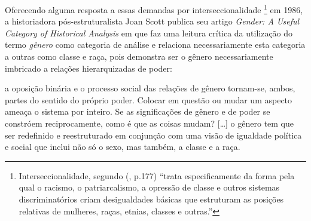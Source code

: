 
Oferecendo alguma resposta a essas demandas por interseccionalidade
\footnote{Interseccionalidade, segundo  (\citeyear{CRENSHAW2002}, p.177) ``trata especificamente da forma pela qual o racismo, o patriarcalismo, a opressão de classe e outros sistemas discriminatórios criam desigualdades básicas que estruturam as posições relativas de mulheres, raças, etnias, classes e outras.''} em 1986, a historiadora pós-estruturalista Joan Scott publica seu artigo \emph{Gender: A Useful Category of Historical Analysis} em que faz uma leitura crítica da utilização do termo \emph{gênero} como categoria de análise e relaciona necessariamente esta categoria a outras como classe e raça, pois demonstra ser o gênero necessariamente imbricado a relações hierarquizadas de poder:

\begin{citacao}
a oposição binária e o processo social das relações de gênero tornam-se,
ambos, partes do sentido do próprio poder. Colocar em questão ou mudar um aspecto ameaça o sistema por inteiro. Se as significações de gênero e de poder se constróem reciprocamente, como é que as coisas mudam? [\ldots] o gênero tem que ser redefinido e reestruturado em conjunção com uma visão de igualdade política e social que inclui não só o sexo, mas também, a classe e a raça. \cite[p.1073,1075]{SCOTT1986}
\end{citacao}


